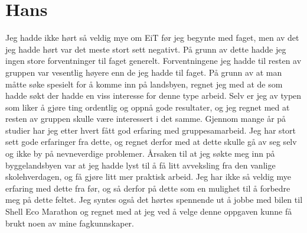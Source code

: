 \section{Hans}
Jeg hadde ikke hørt så veldig mye om EiT før jeg begynte med faget, men av det jeg hadde hørt var det meste stort sett negativt. På grunn av dette hadde jeg ingen store forventninger til faget generelt. \newline
Forventningene jeg hadde til resten av gruppen var vesentlig høyere enn de jeg hadde til faget. På grunn av at man måtte søke spesielt for å komme inn på landsbyen, regnet jeg med at de som hadde søkt der hadde en viss interesse for denne type arbeid. Selv er jeg av typen som liker å gjøre ting ordentlig og oppnå gode resultater, og jeg regnet med at resten av gruppen skulle være interessert i det samme.\newline
Gjennom mange år på studier har jeg etter hvert fått god erfaring med gruppesamarbeid. Jeg har stort sett gode erfaringer fra dette, og regnet derfor med at dette skulle gå av seg selv og ikke by på nevneverdige problemer.\newline 
Årsaken til at jeg søkte meg inn på byggelandsbyen var at jeg hadde lyst til å få litt avveksling fra den vanlige skolehverdagen, og få gjøre litt mer praktisk arbeid. Jeg har ikke så veldig mye erfaring med dette fra før, og så derfor på dette som en mulighet til å forbedre meg på dette feltet. Jeg syntes også det hørtes spennende ut å jobbe med bilen til Shell Eco Marathon og regnet med at jeg ved å velge denne oppgaven kunne få brukt noen av mine fagkunnskaper.

